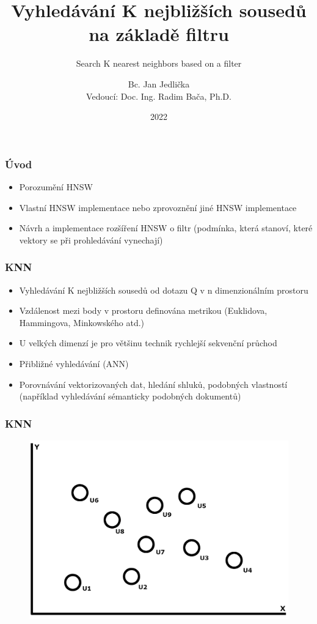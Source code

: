 \documentclass{beamer}
\title[Semestrální práce]{Vyhledávání K nejbližších sousedů na základě filtru}
\subtitle{Search K nearest neighbors based on a filter}
\author[Bc. Jan Jedlička, JED0050]{Bc. Jan Jedlička \\ {\footnotesize Vedoucí: Doc. Ing. Radim Bača, Ph.D.}}
\institute[]{FEI, VŠB-TUO}
\date{2022}
\begin{document}
	
	\frame{\titlepage}
	
	\begin{frame}
		\frametitle{Úvod}
		
		\begin{itemize}
			\item Porozumění HNSW
			\item Vlastní HNSW implementace nebo zprovoznění jiné HNSW implementace
			\item Návrh a implementace rozšíření HNSW o filtr (podmínka, která stanoví, které vektory se při prohledávání vynechají)
		\end{itemize}
		
	\end{frame}

	\begin{frame}
		\frametitle{KNN}
		
		\begin{itemize}
			\item Vyhledávání K nejbližších sousedů od dotazu Q v n dimenzionálním prostoru
			\item Vzdálenost mezi body v prostoru definována metrikou (Euklidova, Hammingova, Minkowského atd.)
			\item U velkých dimenzí je pro většinu technik rychlejší sekvenční průchod
			\item Přibližné vyhledávání (ANN)
			\item Porovnávání vektorizovaných dat, hledání shluků, podobných vlastností (například vyhledávání sémanticky podobných dokumentů)
		\end{itemize}
		
	\end{frame}

	\begin{frame}
		\frametitle{KNN}
		\begin{figure}
			\includegraphics[scale=0.2]{figures/KNN_b1.jpg}
		\end{figure}
	\end{frame}
	
\end{document}
